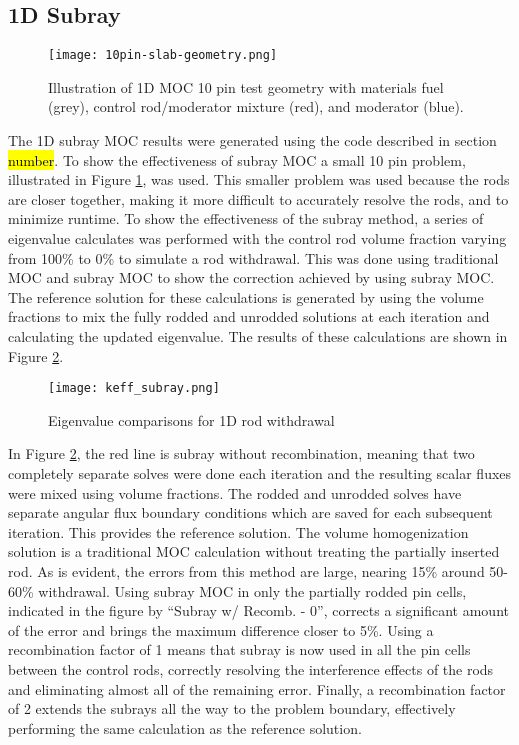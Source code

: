 \subsection{1D Subray}

\begin{figure}[h]
    \centering
    \texttt{[image: 10pin-slab-geometry.png]}
    \caption[Illustration of 1D MOC 10 Pin Geometry]{Illustration of 1D MOC 10 pin test geometry with materials fuel (grey), control rod/moderator mixture (red), and moderator (blue).}\label{f:10pin-geom}
\end{figure}

The 1D subray MOC results were generated using the code described in section \hl{number}.  To show the effectiveness of subray MOC a small 10 pin problem, illustrated in Figure \ref{f:10pin-geom}, was used.  This smaller problem was used because the rods are closer together, making it more difficult to accurately resolve the rods, and to minimize runtime.  To show the effectiveness of the subray method, a series of eigenvalue calculates was performed with the control rod volume fraction varying from 100\% to 0\% to simulate a rod withdrawal.  This was done using traditional MOC and subray MOC to show the correction achieved by using subray MOC.  The reference solution for these calculations is generated by using the volume fractions to mix the fully rodded and unrodded solutions at each iteration and calculating the updated eigenvalue.  The results of these calculations are shown in Figure \ref{f:1d-subray-keff}.

\begin{figure}[h]
    \centering
    \texttt{[image: keff\_subray.png]}
    \caption{Eigenvalue comparisons for 1D rod withdrawal}\label{f:1d-subray-keff}
\end{figure}

In Figure \ref{f:1d-subray-keff}, the red line is subray without recombination, meaning that two completely separate solves were done each iteration and the resulting scalar fluxes were mixed using volume fractions.  The rodded and unrodded solves have separate angular flux boundary conditions which are saved for each subsequent iteration.  This provides the reference solution.  The volume homogenization solution is a traditional MOC calculation without treating the partially inserted rod.  As is evident, the errors from this method are large, nearing 15\% around 50-60\% withdrawal.  Using subray MOC in only the partially rodded pin cells, indicated in the figure by ``Subray w/ Recomb. - 0'', corrects a significant amount of the error and brings the maximum difference closer to 5\%.  Using a recombination factor of 1 means that subray is now used in all the pin cells between the control rods, correctly resolving the interference effects of the rods and eliminating almost all of the remaining error.  Finally, a recombination factor of 2 extends the subrays all the way to the problem boundary, effectively performing the same calculation as the reference solution.

